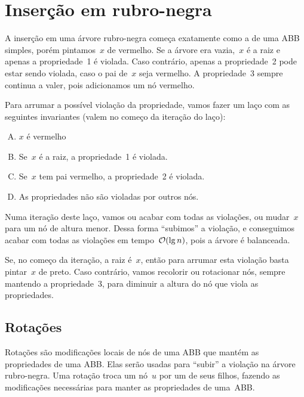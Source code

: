 \documentclass[main.tex]{subfiles}
\begin{document}
\section{Inserção em rubro-negra}

A inserção em uma árvore rubro-negra começa exatamente como a de uma ABB simples, porém pintamos~$x$ de vermelho.
Se a árvore era vazia,~$x$ é a raiz e apenas a propriedade~1 é violada. Caso contrário, apenas a propriedade~2 pode estar sendo violada, caso o pai de~$x$ seja vermelho. A propriedade~3 sempre continua a valer, pois adicionamos um nó vermelho.

Para arrumar a possível violação da propriedade, vamos fazer um laço com as seguintes invariantes (valem no começo da iteração do laço):
\begin{enumerate}[(A)]
\item $x$ é vermelho
\item Se~$x$ é a raiz, a propriedade~1 é violada.
\item Se~$x$ tem pai vermelho, a propriedade~2 é violada.
\item As propriedades não são violadas por outros nós.
\end{enumerate}

Numa iteração deste laço, vamos ou acabar com todas as violações, ou mudar~$x$ para um nó de altura menor. Dessa forma ``subimos'' a violação, e conseguimos acabar com todas as violações em tempo~$\mathcal{O}(\lg n)$, pois a árvore é balanceada.

Se, no começo da iteração, a raiz é~$x$, então para arrumar esta violação basta pintar~$x$ de preto. Caso contrário, vamos recolorir ou rotacionar nós, sempre mantendo a propriedade~3, para diminuir a altura do nó que viola as propriedades.

\subsection{Rotações}

Rotações são modificações locais de nós de uma ABB que mantém as propriedades de uma ABB. Elas serão usadas para ``subir'' a violação na árvore rubro-negra. Uma rotação troca um nó~$u$ por um de seus filhos, fazendo as modificações necessárias para manter as propriedades de uma~ABB.
\end{document}
